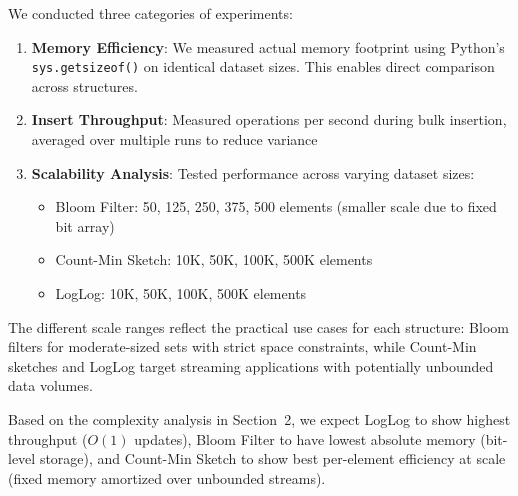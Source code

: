 We conducted three categories of experiments:

\begin{enumerate}
    \item \textbf{Memory Efficiency}: We measured actual memory footprint using Python's \texttt{sys.getsizeof()} on identical dataset sizes. This enables direct comparison across structures.

    \item \textbf{Insert Throughput}: Measured operations per second during bulk insertion, averaged over multiple runs to reduce variance

    \item \textbf{Scalability Analysis}: Tested performance across varying dataset sizes:
    \begin{itemize}
        \item Bloom Filter: 50, 125, 250, 375, 500 elements (smaller scale due to fixed bit array)
        \item Count-Min Sketch: 10K, 50K, 100K, 500K elements
        \item LogLog: 10K, 50K, 100K, 500K elements
    \end{itemize}
\end{enumerate}

The different scale ranges reflect the practical use cases for each structure: Bloom filters for moderate-sized sets with strict space constraints, while Count-Min sketches and LogLog target streaming applications with potentially unbounded data volumes.

Based on the complexity analysis in Section~2, we expect LogLog to show highest throughput ($O(1)$ updates), Bloom Filter to have lowest absolute memory (bit-level storage), and Count-Min Sketch to show best per-element efficiency at scale (fixed memory amortized over unbounded streams).